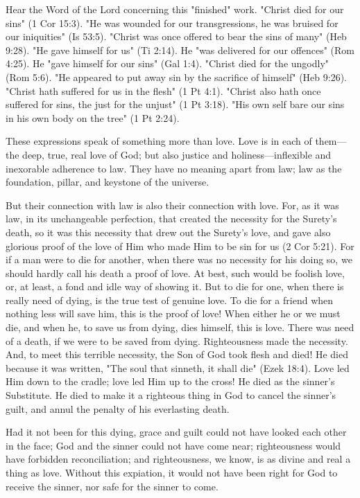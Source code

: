\documentclass[
]{book}
\begin{document}
Hear the Word of the Lord concerning this "finished" work. "Christ died for our sins" (1 Cor 15:3). "He was wounded for our transgressions, he was bruised for our iniquities" (Is 53:5). "Christ was once offered to bear the sins of many" (Heb 9:28). "He gave himself for us" (Ti 2:14). He "was delivered for our offences" (Rom 4:25). He "gave himself for our sins" (Gal 1:4). "Christ died for the ungodly" (Rom 5:6). "He appeared to put away sin by the sacrifice of himself" (Heb 9:26). "Christ hath suffered for us in the flesh" (1 Pt 4:1). "Christ also hath once suffered for sins, the just for the unjust" (1 Pt 3:18). "His own self bare our sins in his own body on the tree" (1 Pt 2:24).

These expressions speak of something more than love. Love is in each of them---the deep, true, real love of God; but also justice and holiness---inflexible and inexorable adherence to law. They have no meaning apart from law; law as the foundation, pillar, and keystone of the universe.

But their connection with law is also their connection with love. For, as it was law, in its unchangeable perfection, that created the necessity for the Surety's death, so it was this necessity that drew out the Surety's love, and gave also glorious proof of the love of Him who made Him to be sin for us (2 Cor 5:21). For if a man were to die for another, when there was no necessity for his doing so, we should hardly call his death a proof of love. At best, such would be foolish love, or, at least, a fond and idle way of showing it. But to die for one, when there is really need of dying, is the true test of genuine love. To die for a friend when nothing less will save him, this is the proof of love! When either he or we must die, and when he, to save us from dying, dies himself, this is love. There was need of a death, if we were to be saved from dying. Righteousness made the necessity. And, to meet this terrible necessity, the Son of God took flesh and died! He died because it was written, "The soul that sinneth, it shall die" (Ezek 18:4). Love led Him down to the cradle; love led Him up to the cross! He died as the sinner's Substitute. He died to make it a righteous thing in God to cancel the sinner's guilt, and annul the penalty of his everlasting death.

Had it not been for this dying, grace and guilt could not have looked each other in the face; God and the sinner could not have come near; righteousness would have forbidden reconciliation; and righteousness, we know, is as divine and real a thing as love. Without this expiation, it would not have been right for God to receive the sinner, nor safe for the sinner to come.
\end{document}
